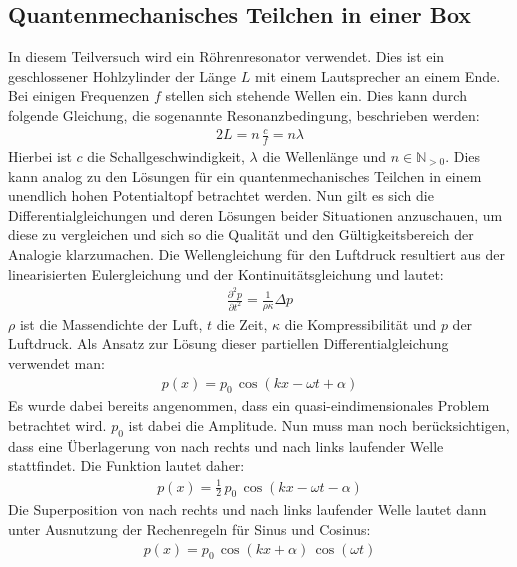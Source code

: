 \documentclass[german,  %
parskip=full,  %
]{scrartcl}
\begin{document}
\subsection{Quantenmechanisches Teilchen in einer Box}
In diesem Teilversuch wird ein Röhrenresonator verwendet. Dies ist ein geschlossener Hohlzylinder der Länge $L$ mit einem Lautsprecher an einem Ende. Bei einigen Frequenzen $f$ stellen sich stehende Wellen ein. Dies kann durch folgende Gleichung, die sogenannte Resonanzbedingung, beschrieben werden:
\begin{align}
\label{1}2L = n \, \frac{c}{f} = n\lambda
\end{align}
Hierbei ist $c$ die Schallgeschwindigkeit, $\lambda$ die Wellenlänge und $n  \in \mathbb{N}_{>0}$. Dies kann analog zu den Lösungen für ein quantenmechanisches Teilchen in einem unendlich hohen Potentialtopf betrachtet werden.
\newline
\newline Nun gilt es sich die Differentialgleichungen und deren Lösungen beider Situationen anzuschauen, um diese zu vergleichen und sich so die Qualität und den Gültigkeitsbereich der Analogie klarzumachen.
\newline
\newline Die Wellengleichung für den Luftdruck resultiert aus der linearisierten Eulergleichung und der Kontinuitätsgleichung und lautet:
\begin{align}
\frac{\partial^2p}{\partial t^2}=\frac{1}{\rho \kappa} \Delta p
\end{align}
$\rho$ ist die Massendichte der Luft, $t$ die Zeit, $\kappa$ die Kompressibilität und $p$ der Luftdruck. Als Ansatz zur Lösung dieser partiellen Differentialgleichung verwendet man:
\begin{align}
p(x)=p_0 \, \cos(kx-\omega t +\alpha)
\end{align}
Es wurde dabei bereits angenommen, dass ein quasi-eindimensionales Problem betrachtet wird. $p_0$ ist dabei die Amplitude. 
Nun muss man noch berücksichtigen, dass eine Überlagerung von nach rechts und nach links laufender Welle stattfindet. Die Funktion lautet daher:
\begin{align}
p(x)=\frac{1}{2}\,p_0 \, \cos(kx-\omega t -\alpha)
\end{align}
Die Superposition von nach rechts und nach links laufender Welle lautet dann unter Ausnutzung der Rechenregeln für Sinus und Cosinus:
\begin{align}
p(x)=p_0 \, \cos(kx+\alpha)\, \cos(\omega t)
\end{align}
\end{document}
